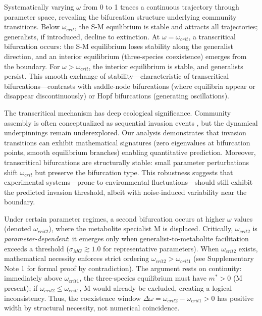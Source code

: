\documentclass[9pt,twocolumn]{pnas-new}
\begin{document}
Systematically varying $\omega$ from 0 to 1 traces a continuous trajectory through parameter space, revealing the bifurcation structure underlying community transitions. Below $\omega_{crit}$, the S-M equilibrium is stable and attracts all trajectories; generalists, if introduced, decline to extinction. At $\omega = \omega_{crit}$, a transcritical bifurcation occurs: the S-M equilibrium loses stability along the generalist direction, and an interior equilibrium (three-species coexistence) emerges from the boundary. For $\omega > \omega_{crit}$, the interior equilibrium is stable, and generalists persist. This smooth exchange of stability—characteristic of transcritical bifurcations—contrasts with saddle-node bifurcations (where equilibria appear or disappear discontinuously) or Hopf bifurcations (generating oscillations).

The transcritical mechanism has deep ecological significance. Community assembly is often conceptualized as sequential invasion events \cite{law1996permanence,urban2008landscape}, but the dynamical underpinnings remain underexplored. Our analysis demonstrates that invasion transitions can exhibit mathematical signatures (zero eigenvalues at bifurcation points, smooth equilibrium branches) enabling quantitative prediction. Moreover, transcritical bifurcations are structurally stable: small parameter perturbations shift $\omega_{crit}$ but preserve the bifurcation type. This robustness suggests that experimental systems—prone to environmental fluctuations—should still exhibit the predicted invasion threshold, albeit with noise-induced variability near the boundary.

Under certain parameter regimes, a second bifurcation occurs at higher $\omega$ values (denoted $\omega_{crit2}$), where the metabolite specialist M is displaced. Critically, $\omega_{crit2}$ is \textit{parameter-dependent}: it emerges only when generalist-to-metabolite facilitation exceeds a threshold ($\sigma_{MG} \gtrsim 1.0$ for representative parameters). When $\omega_{crit2}$ exists, mathematical necessity enforces strict ordering $\omega_{crit2} > \omega_{crit1}$ (see Supplementary Note 1 for formal proof by contradiction). The argument rests on continuity: immediately above $\omega_{crit1}$, the three-species equilibrium must have $m^* > 0$ (M present); if $\omega_{crit2} \leq \omega_{crit1}$, M would already be excluded, creating a logical inconsistency. Thus, the coexistence window $\Delta\omega = \omega_{crit2} - \omega_{crit1} > 0$ has positive width by structural necessity, not numerical coincidence.
\end{document}

